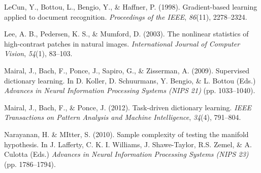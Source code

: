 \documentclass{article} %
\begin{document}
\begin{thebibliography}{100}
LeCun, Y., Bottou, L., Bengio, Y., \& Haffner, P. (1998). 
\newblock Gradient-based learning applied to document recognition. 
\newblock \emph{Proceedings of the IEEE}, \emph{86}(11), 2278--2324.

Lee, A. B., Pedersen, K. S., \& Mumford, D. (2003). 
\newblock The nonlinear statistics of high-contrast patches in natural images. 
\newblock \emph{International Journal of Computer Vision}, \emph{54}(1), 83--103.




Mairal, J., Bach, F., Ponce, J., Sapiro, G., \& Zisserman, A. (2009).
\newblock Supervised dictionary learning.
\newblock In D. Koller, D. Schuurmans, Y. Bengio, \& L. Bottou (Eds.) \emph{Advances in Neural Information Processing Systems (NIPS 21)} (pp. 1033--1040).

Mairal, J., Bach, F., \& Ponce, J. (2012). 
\newblock Task-driven dictionary learning. 
\newblock \emph{IEEE Transactions on Pattern Analysis and Machine Intelligence}, \emph{34}(4), 791--804.


Narayanan, H. \& MItter, S. (2010).
\newblock Sample complexity of testing the manifold hypothesis.
\newblock In J. Lafferty, C. K. I. Williams, J. Shawe-Taylor, R.S. Zemel, \& A. Culotta (Eds.) \emph{Advances in Neural Information Processing Systems (NIPS 23)} (pp. 1786--1794).


\end{thebibliography}
\end{document}
